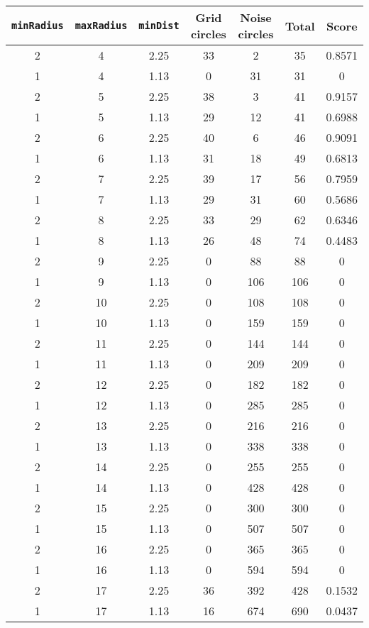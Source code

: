 \documentclass[letterpaper, 12pt]{article}
\begin{document}
\begin{longtable}{|c|c|c|c|c|c|c|}
\hline
\textbf{\texttt{minRadius}} & \textbf{\texttt{maxRadius}} & \textbf{\texttt{minDist}} & \textbf{Grid circles} & \textbf{Noise circles} & \textbf{Total} & \textbf{Score} \\
\hline
2 & 4 & 2.25 & 33 & 2 & 35 & 0.8571 \\
\hline
1 & 4 & 1.13 & 0 & 31 & 31 & 0 \\
\hline
2 & 5 & 2.25 & 38 & 3 & 41 & 0.9157 \\
\hline
1 & 5 & 1.13 & 29 & 12 & 41 & 0.6988 \\
\hline
2 & 6 & 2.25 & 40 & 6 & 46 & 0.9091 \\
\hline
1 & 6 & 1.13 & 31 & 18 & 49 & 0.6813 \\
\hline
2 & 7 & 2.25 & 39 & 17 & 56 & 0.7959 \\
\hline
1 & 7 & 1.13 & 29 & 31 & 60 & 0.5686 \\
\hline
2 & 8 & 2.25 & 33 & 29 & 62 & 0.6346 \\
\hline
1 & 8 & 1.13 & 26 & 48 & 74 & 0.4483 \\
\hline
2 & 9 & 2.25 & 0 & 88 & 88 & 0 \\
\hline
1 & 9 & 1.13 & 0 & 106 & 106 & 0 \\
\hline
2 & 10 & 2.25 & 0 & 108 & 108 & 0 \\
\hline
1 & 10 & 1.13 & 0 & 159 & 159 & 0 \\
\hline
2 & 11 & 2.25 & 0 & 144 & 144 & 0 \\
\hline
1 & 11 & 1.13 & 0 & 209 & 209 & 0 \\
\hline
2 & 12 & 2.25 & 0 & 182 & 182 & 0 \\
\hline
1 & 12 & 1.13 & 0 & 285 & 285 & 0 \\
\hline
2 & 13 & 2.25 & 0 & 216 & 216 & 0 \\
\hline
1 & 13 & 1.13 & 0 & 338 & 338 & 0 \\
\hline
2 & 14 & 2.25 & 0 & 255 & 255 & 0 \\
\hline
1 & 14 & 1.13 & 0 & 428 & 428 & 0 \\
\hline
2 & 15 & 2.25 & 0 & 300 & 300 & 0 \\
\hline
1 & 15 & 1.13 & 0 & 507 & 507 & 0 \\
\hline
2 & 16 & 2.25 & 0 & 365 & 365 & 0 \\
\hline
1 & 16 & 1.13 & 0 & 594 & 594 & 0 \\
\hline
2 & 17 & 2.25 & 36 & 392 & 428 & 0.1532 \\
\hline
1 & 17 & 1.13 & 16 & 674 & 690 & 0.0437 \\

\end{longtable}
\end{document}
